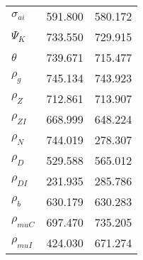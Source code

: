 \begin{center}
\begin{longtable}{lcc}
$ {\sigma_{ai}}        $	 & 	     591.800	 & 	     580.172 \\ 
$ {\Psi_{K}}           $	 & 	     733.550	 & 	     729.915 \\ 
$ {\theta}             $	 & 	     739.671	 & 	     715.477 \\ 
$ {\rho_g}             $	 & 	     745.134	 & 	     743.923 \\ 
$ {\rho_Z}             $	 & 	     712.861	 & 	     713.907 \\ 
$ {\rho_{ZI}}          $	 & 	     668.999	 & 	     648.224 \\ 
$ {\rho_N}             $	 & 	     744.019	 & 	     278.307 \\ 
$ {\rho_D}             $	 & 	     529.588	 & 	     565.012 \\ 
$ {\rho_{DI}}          $	 & 	     231.935	 & 	     285.786 \\ 
$ {\rho_b}             $	 & 	     630.179	 & 	     630.283 \\ 
$ {\rho_{muC}}         $	 & 	     697.470	 & 	     735.205 \\ 
$ {\rho_{muI}}         $	 & 	     424.030	 & 	     671.274 \\ 
\end{longtable}
 \end{center}

